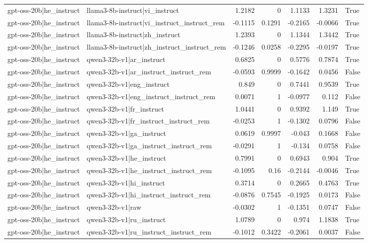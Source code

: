 \begin{table}
\begin{tabular}{l l r r r r l}
gpt-oss-20b|he_instruct & llama3-8b-instruct|vi_instruct & 1.2182 & 0 & 1.1133 & 1.3231 & True \\
gpt-oss-20b|he_instruct & llama3-8b-instruct|vi_instruct_instruct_rem & -0.1115 & 0.1291 & -0.2165 & -0.0066 & True \\
gpt-oss-20b|he_instruct & llama3-8b-instruct|zh_instruct & 1.2393 & 0 & 1.1344 & 1.3442 & True \\
gpt-oss-20b|he_instruct & llama3-8b-instruct|zh_instruct_instruct_rem & -0.1246 & 0.0258 & -0.2295 & -0.0197 & True \\
gpt-oss-20b|he_instruct & qwen3-32b-v1|ar_instruct & 0.6825 & 0 & 0.5776 & 0.7874 & True \\
gpt-oss-20b|he_instruct & qwen3-32b-v1|ar_instruct_instruct_rem & -0.0593 & 0.9999 & -0.1642 & 0.0456 & False \\
gpt-oss-20b|he_instruct & qwen3-32b-v1|eng_instruct & 0.849 & 0 & 0.7441 & 0.9539 & True \\
gpt-oss-20b|he_instruct & qwen3-32b-v1|eng_instruct_instruct_rem & 0.0071 & 1 & -0.0977 & 0.112 & False \\
gpt-oss-20b|he_instruct & qwen3-32b-v1|fr_instruct & 1.0441 & 0 & 0.9392 & 1.149 & True \\
gpt-oss-20b|he_instruct & qwen3-32b-v1|fr_instruct_instruct_rem & -0.0253 & 1 & -0.1302 & 0.0796 & False \\
gpt-oss-20b|he_instruct & qwen3-32b-v1|ga_instruct & 0.0619 & 0.9997 & -0.043 & 0.1668 & False \\
gpt-oss-20b|he_instruct & qwen3-32b-v1|ga_instruct_instruct_rem & -0.0291 & 1 & -0.134 & 0.0758 & False \\
gpt-oss-20b|he_instruct & qwen3-32b-v1|he_instruct & 0.7991 & 0 & 0.6943 & 0.904 & True \\
gpt-oss-20b|he_instruct & qwen3-32b-v1|he_instruct_instruct_rem & -0.1095 & 0.16 & -0.2144 & -0.0046 & True \\
gpt-oss-20b|he_instruct & qwen3-32b-v1|hi_instruct & 0.3714 & 0 & 0.2665 & 0.4763 & True \\
gpt-oss-20b|he_instruct & qwen3-32b-v1|hi_instruct_instruct_rem & -0.0876 & 0.7545 & -0.1925 & 0.0173 & False \\
gpt-oss-20b|he_instruct & qwen3-32b-v1|raw & -0.0302 & 1 & -0.1351 & 0.0747 & False \\
gpt-oss-20b|he_instruct & qwen3-32b-v1|ru_instruct & 1.0789 & 0 & 0.974 & 1.1838 & True \\
gpt-oss-20b|he_instruct & qwen3-32b-v1|ru_instruct_instruct_rem & -0.1012 & 0.3422 & -0.2061 & 0.0037 & False \\

\end{tabular}
\end{table}
